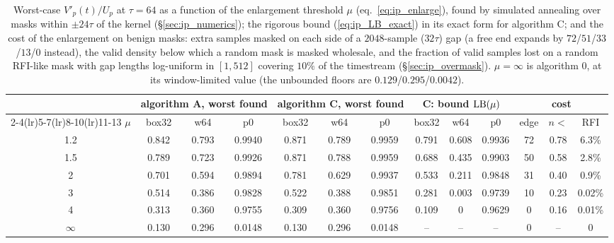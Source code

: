 \documentclass{article}
\numberwithin{equation}{section}   %
\begin{document}
\begin{table}[ht]
\centering\small
\begin{tabular}{c ccc ccc ccc ccc}
\toprule
 & \multicolumn{3}{c}{algorithm A, worst found} & \multicolumn{3}{c}{algorithm C, worst found}
 & \multicolumn{3}{c}{C: bound ${\rm LB}(\mu)$} & \multicolumn{3}{c}{cost} \\
\cmidrule(lr){2-4}\cmidrule(lr){5-7}\cmidrule(lr){8-10}\cmidrule(lr){11-13}
$\mu$ & box32 & w64 & p0 & box32 & w64 & p0 & box32 & w64 & p0 & edge & $n <$ & RFI \\
\midrule
1.2 & 0.842 & 0.793 & 0.9940 & 0.871 & 0.789 & 0.9959 & 0.791 & 0.608 & 0.9936 & 72 & 0.78 & 6.3\% \\
1.5 & 0.789 & 0.723 & 0.9926 & 0.871 & 0.788 & 0.9959 & 0.688 & 0.435 & 0.9903 & 50 & 0.58 & 2.8\% \\
2   & 0.701 & 0.594 & 0.9894 & 0.781 & 0.629 & 0.9937 & 0.533 & 0.211 & 0.9848 & 31 & 0.40 & 0.9\% \\
3   & 0.514 & 0.386 & 0.9828 & 0.522 & 0.388 & 0.9851 & 0.281 & 0.003 & 0.9739 & 10 & 0.23 & 0.02\% \\
4   & 0.313 & 0.360 & 0.9755 & 0.309 & 0.360 & 0.9756 & 0.109 & 0 & 0.9629 & 0 & 0.16 & 0.01\% \\
$\infty$ & 0.130 & 0.296 & 0.0148 & 0.130 & 0.296 & 0.0148 & -- & -- & -- & 0 & -- & 0 \\
\bottomrule
\end{tabular}
\caption{Worst-case $V'_p(t)/U_p$ at $\tau = 64$ as a function of the enlargement threshold $\mu$
(eq.\ \ref{eq:ip_enlarge}), found by simulated annealing over masks within $\pm 24\tau$ of the kernel
(\S\ref{sec:ip_numerics}); the rigorous bound (\ref{eq:ip_LB_exact}) in its exact form for algorithm C;
and the cost of the enlargement on benign masks: extra samples masked on each side of a $2048$-sample
($32\tau$) gap (a free end expands by $72$/$51$/$33$/$13$/$0$ instead), the valid density below which a
random mask is masked wholesale, and the fraction of valid samples lost on a random RFI-like mask with
gap lengths log-uniform in $[1, 512]$ covering $10\%$ of the timestream (\S\ref{sec:ip_overmask}).
$\mu = \infty$ is algorithm 0, at its window-limited value (the unbounded floors are
$0.129$/$0.295$/$0.0042$).}
\label{tab:ip_summary}
\end{table}
\end{document}
